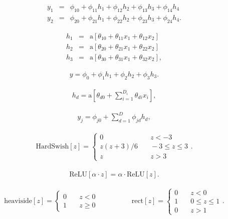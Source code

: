 \documentclass[letterpaper,twoside,openany, titlepage,oldfontcommands,titles,dvipsnames]{memoir}
\begin{document}
\begin{eqnarray}\label{eq:snn_multiple_out1}
 y_1 &=& \phi_{10}+\phi_{11}h_{1}+\phi_{12}h_{2}+\phi_{13}h_{3}+\phi_{14}h_{4}\nonumber \\
 y_2 &=& \phi_{20}+\phi_{21}h_{1}+\phi_{22}h_{2}+\phi_{23}h_{3}+\phi_{24}h_{4}.
 \end{eqnarray}

\begin{eqnarray}\label{eq:snn_multiple3}
 h_{1} &=& \mbox{a}[\theta_{10} + \theta_{11}x_1+ \theta_{12}x_2] \nonumber \\
 h_{2} &=& \mbox{a}[\theta_{20} + \theta_{21}x_1+\theta_{22}x_2] \nonumber \\
 h_{3} &=& \mbox{a}[\theta_{30} + \theta_{31}x_1+\theta_{32}x_2],
 \end{eqnarray}

\begin{eqnarray}\label{eq:snn_multiple4}
 y = \phi_{0}+\phi_{1}h_{1}+\phi_{2}h_{2}+\phi_{3}h_{3}.
 \end{eqnarray}

\begin{eqnarray}\label{eq:snn_general_1}
 h_{d} = \mbox{a}\left[\theta_{d0} + \sum_{i=1}^{D_{i}}\theta_{di}x_i\right], 
 \end{eqnarray}

\begin{eqnarray}\label{eq:snn_general_2}
 y_j = \phi_{j0}+\sum_{d=1}^{D}\phi_{jd}h_{d},
 \end{eqnarray}

\begin{eqnarray}\label{eq:snn_harswish}
 \mbox{HardSwish}[z] = \begin{cases} 0 & \quad z <-3 \\ z(z+3)/6 & \quad -3\leq z\leq 3 \\ z &\quad z>3 \end{cases}.
 \end{eqnarray}

\begin{eqnarray}
  \mbox{ReLU}[\alpha \cdot z] = \alpha \cdot \mbox{ReLU}[z].
 \end{eqnarray}

\begin{eqnarray}
 \mbox{heaviside}[z] = \begin{cases} 0 & \quad z <0 \\ 1 & \quad z\geq 0\end{cases} \hspace{2cm} \mbox{rect}[z] = \begin{cases} 0 & \quad z < 0 \\ 1 & \quad 0 \leq z\leq 1 \\ 0 & \quad z > 1\end{cases}.
 \end{eqnarray}
\end{document}
